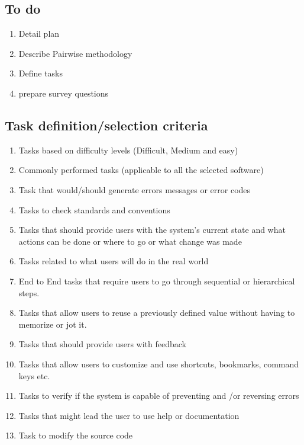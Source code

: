 \documentclass[letterpaper,cleveref]{lipics-v2019}
\theoremstyle{definition}
\begin{document}
\subsection{To do}
\begin {enumerate}
 \item Detail plan
 \item Describe Pairwise methodology
 \item Define tasks
 \item prepare survey questions
 \end {enumerate}
 
\subsection{Task definition/selection criteria}
\begin {enumerate}
\item Tasks based on difficulty levels (Difficult, Medium and easy)
\item Commonly performed tasks (applicable to all the selected software)
\item Task that would/should generate errors messages or error codes
\item Tasks to check standards and conventions
\item Tasks that should provide users with the system's current state and what actions can be done or where to go or what change was made
\item Tasks related to what users will do in the real world
\item End to End tasks that require users to go through sequential or hierarchical steps.
\item Tasks that allow users to reuse a previously defined value without having to memorize or jot it.
\item Tasks that should provide users with feedback
\item Tasks that allow users to customize and use shortcuts, bookmarks, command keys etc.
\item Tasks to verify if the system is capable of preventing and /or reversing errors
\item Tasks that might lead the user to use help or documentation
\item Task to modify the source code

\end {enumerate} 
\end{document}
